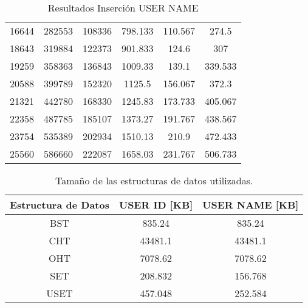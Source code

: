 \begin{table}[H]
\begin{tabular}{cccccc}
16644               & 282553       & 108336       & 798.133      & 110.567      & 274.5         \\
18643               & 319884       & 122373       & 901.833      & 124.6        & 307           \\
19259               & 358363       & 136843       & 1009.33      & 139.1        & 339.533       \\
20588               & 399789       & 152320       & 1125.5       & 156.067      & 372.3         \\
21321               & 442780       & 168330       & 1245.83      & 173.733      & 405.067       \\
22358               & 487785       & 185107       & 1373.27      & 191.767      & 438.567       \\
23754               & 535389       & 202934       & 1510.13      & 210.9        & 472.433       \\
25560               & 586660       & 222087       & 1658.03      & 231.767      & 506.733       \\ \hline
\end{tabular}
\caption{Resultados Inserción USER NAME}
\label{tab:insercion_user_name_all}
\end{table}

\begin{table}[ht]
\begin{center}
\begin{tabular}{ccc} %
\hline
\multicolumn{1}{c}{Estructura de Datos} & \multicolumn{1}{c}{USER ID [KB]} &
\multicolumn{1}{c}{USER NAME [KB]}\\
\hline
BST  & 835.24  & 835.24    \\
CHT  & 43481.1 & 43481.1   \\
OHT  & 7078.62 & 7078.62   \\
SET  & 208.832 & 156.768   \\
USET & 457.048 & 252.584   \\
\hline
\end{tabular}
\caption{Tamaño de las estructuras de datos utilizadas.}
\label{tab:sizes_estructuras}
\end{center}
\end{table}
